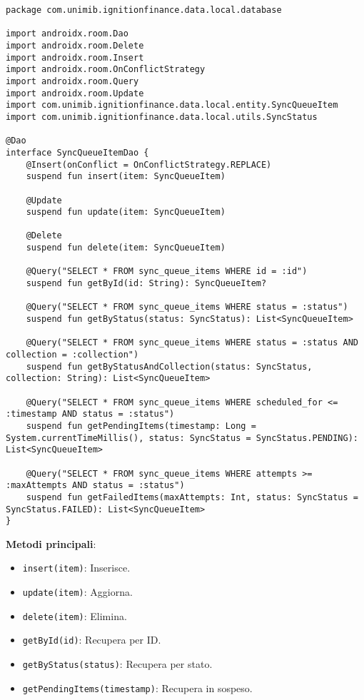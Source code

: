 \begin{lstlisting}[caption=SyncQueueItemDao.kt, label=lst:syncqueueitemdao, basicstyle=\ttfamily\scriptsize, breaklines=true, breakatwhitespace=true, tabsize=4, backgroundcolor=\color{codegray}]
package com.unimib.ignitionfinance.data.local.database

import androidx.room.Dao
import androidx.room.Delete
import androidx.room.Insert
import androidx.room.OnConflictStrategy
import androidx.room.Query
import androidx.room.Update
import com.unimib.ignitionfinance.data.local.entity.SyncQueueItem
import com.unimib.ignitionfinance.data.local.utils.SyncStatus

@Dao
interface SyncQueueItemDao {
    @Insert(onConflict = OnConflictStrategy.REPLACE)
    suspend fun insert(item: SyncQueueItem)

    @Update
    suspend fun update(item: SyncQueueItem)

    @Delete
    suspend fun delete(item: SyncQueueItem)

    @Query("SELECT * FROM sync_queue_items WHERE id = :id")
    suspend fun getById(id: String): SyncQueueItem?

    @Query("SELECT * FROM sync_queue_items WHERE status = :status")
    suspend fun getByStatus(status: SyncStatus): List<SyncQueueItem>

    @Query("SELECT * FROM sync_queue_items WHERE status = :status AND collection = :collection")
    suspend fun getByStatusAndCollection(status: SyncStatus, collection: String): List<SyncQueueItem>

    @Query("SELECT * FROM sync_queue_items WHERE scheduled_for <= :timestamp AND status = :status")
    suspend fun getPendingItems(timestamp: Long = System.currentTimeMillis(), status: SyncStatus = SyncStatus.PENDING): List<SyncQueueItem>

    @Query("SELECT * FROM sync_queue_items WHERE attempts >= :maxAttempts AND status = :status")
    suspend fun getFailedItems(maxAttempts: Int, status: SyncStatus = SyncStatus.FAILED): List<SyncQueueItem>
}
\end{lstlisting}

\textbf{Metodi principali}:
\begin{itemize}
    \item \texttt{insert(item)}: Inserisce.
    \item \texttt{update(item)}: Aggiorna.
    \item \texttt{delete(item)}: Elimina.
    \item \texttt{getById(id)}: Recupera per ID.
    \item \texttt{getByStatus(status)}: Recupera per stato.
    \item \texttt{getPendingItems(timestamp)}: Recupera in sospeso.
\end{itemize}

